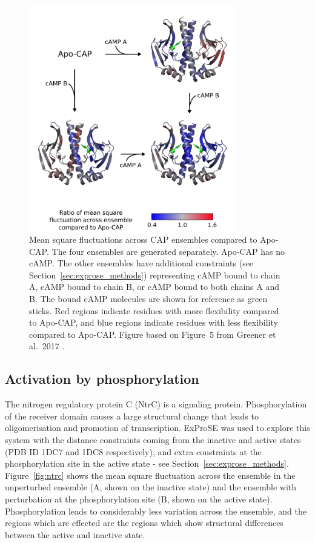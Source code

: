 \begin{figure}
\centering

\includegraphics[width=0.8\textwidth]{figures/cap/cap}

\caption[Mean square fluctuations across perturbed CAP ensembles compared to Apo-CAP]
{Mean square fluctuations across CAP ensembles compared to Apo-CAP.
The four ensembles are generated separately.
Apo-CAP has no cAMP.
The other ensembles have additional constraints (see Section~\ref{sec:exprose_methods}) representing cAMP bound to chain A, cAMP bound to chain B, or cAMP bound to both chains A and B.
The bound cAMP molecules are shown for reference as green sticks.
Red regions indicate residues with more flexibility compared to Apo-CAP, and blue regions indicate residues with less flexibility compared to Apo-CAP.
Figure based on Figure~5 from Greener et al.\ 2017 \cite{Greener2017}.}

\label{fig:cap}
\end{figure}


\subsection{Activation by phosphorylation}

The nitrogen regulatory protein C (NtrC) is a signaling protein.
Phosphorylation of the receiver domain causes a large structural change \cite{Kern1999} that leads to oligomerisation and promotion of transcription.
ExProSE was used to explore this system with the distance constraints coming from the inactive and active states (PDB ID 1DC7 and 1DC8 respectively), and extra constraints at the phosphorylation site in the active state - see Section~\ref{sec:exprose_methods}.
Figure~\ref{fig:ntrc} shows the mean square fluctuation across the ensemble in the unperturbed ensemble (A, shown on the inactive state) and the ensemble with perturbation at the phosphorylation site (B, shown on the active state).
Phosphorylation leads to considerably less variation across the ensemble, and the regions which are effected are the regions which show structural differences between the active and inactive state.

